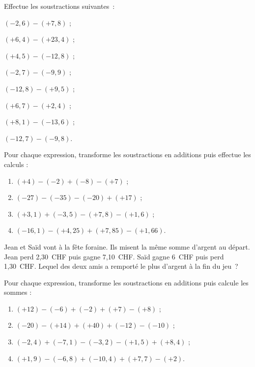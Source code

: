 \begin{exercice}
Effectue les soustractions suivantes :
\begin{colenumerate}{1}
 \item $(-2,6) - (+7,8)$ \dotfill;
 \vspace{0.4em}
 \item $(+6,4) - (+23,4)$ \dotfill;
 \vspace{0.4em}
 \item $(+4,5) - (-12,8)$ \dotfill;
 \vspace{0.4em}
 \item $(-2,7) - (-9,9)$ \dotfill;
 \vspace{0.4em}
 \item $(-12,8) - (+9,5)$ \dotfill;
 \vspace{0.4em}
 \item $(+6,7) - (+2,4)$ \dotfill;
 \vspace{0.4em}
 \item $(+8,1) - (-13,6)$ \dotfill;
 \vspace{0.4em}
 \item $(-12,7) - (-9,8)$\dotfill.
 \end{colenumerate}
\end{exercice}


\begin{exercice}
Pour chaque expression, transforme les soustractions en additions puis effectue les calculs :
\begin{enumerate}
 \item $(+4) - (-2) + (-8) - (+7)$ ;
 \item $(-27) - (-35) - (-20) + (+17)$ ;
 \item $(+3,1) + (-3,5) - (+7,8) - (+1,6)$ ;
 \item $(-16,1) - (+4,25) + (+7,85) - (+1,66)$.
 \end{enumerate}
\end{exercice}


\begin{exercice}
Jean et Saïd vont à la fête foraine. Ils misent la même somme d'argent au départ. Jean perd 2,30 CHF puis gagne 7,10 CHF. Saïd gagne 6 CHF puis perd 1,30 CHF. Lequel des deux amis a remporté le plus d'argent à la fin du jeu ?
\end{exercice}

\columnbreak


\begin{exercice}
Pour chaque expression, transforme les soustractions en additions puis calcule les sommes :
\begin{enumerate}
 \item $(+12) - (-6) + (-2) + (+7) - (+8)$ ;
 \item $(-20) - (+14) + (+40) + (-12) - (-10)$ ;
 \item $(-2,4) + (-7,1) - (-3,2) - (+1,5) + (+8,4)$ ;
 \item $(+1,9) - (-6,8) + (-10,4) + (+7,7) - (+2)$.
 \end{enumerate}
\end{exercice}


